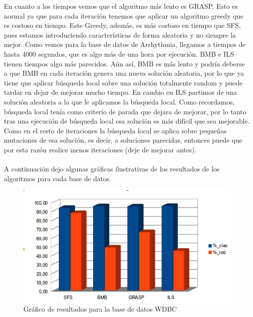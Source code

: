 En cuanto a los tiempos vemos que el algoritmo más lento es GRASP. Esto es normal ya que para cada iteración tenemos que aplicar un algoritmo greedy que es costoso en tiempo. Este Greedy, además, es más costoso en tiempo que SFS, pues estamos introduciendo características de forma aleatoria y no siempre la mejor. Como vemos para la base de datos de Arrhythmia, llegamos a tiempos de hasta 4000 segundos, que es algo más de una hora por ejecución. BMB e ILS tienen tiempos algo más parecidos. Aún así, BMB es más lento y podría deberse a que BMB en cada iteración genera una nueva solución aleatoria, por lo que ya tiene que aplicar búsqueda local sobre una solución totalmente random y puede tardar en dejar de mejorar mucho tiempo. En cambio en ILS partimos de una solución aleatoria a la que le aplicamos la búsqueda local. Como recordamos, búsqueda local tenía como criterio de parada que dejara de mejorar, por lo tanto tras una ejecución de búsqueda local esa solución es más difícil que sea mejorable. Como en el resto de iteraciones la búsqueda local se aplica sobre pequeñas mutaciones de esa solución, es decir, a soluciones parecidas, entonces puede que por esta razón realice menos iteraciones (deje de mejorar antes).
\\
\\
A continuación dejo algunas gráficas ilustrativas de los resultados de los algoritmos para cada base de datos.

\begin{figure} [H]
\centering
\includegraphics[width=1.0\linewidth]{GraficaWDBC}
\caption{Gráfico de resultados para la base de datos WDBC}
\label{fig:GraficaWDBC}
\end{figure}

